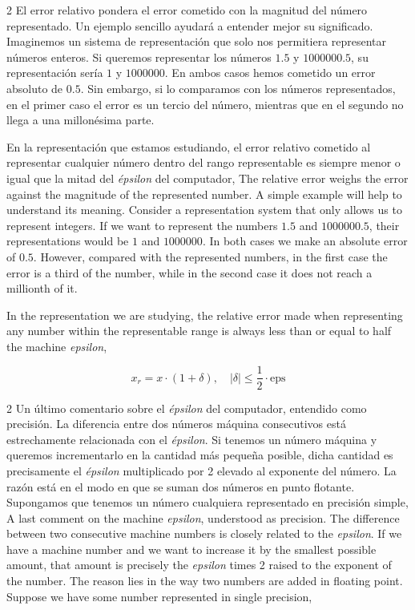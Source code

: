 \begin{paracol}{2}
El error relativo pondera el error cometido con la magnitud del número representado. Un ejemplo sencillo ayudará a entender mejor su significado. Imaginemos un sistema de representación que solo nos permitiera representar números enteros. Si queremos representar los números $1.5$ y $1000000.5$, su representación sería $1$ y $1000000$. En ambos casos hemos cometido un error absoluto de $0.5$. Sin embargo, si lo comparamos con los números representados, en el primer caso el error es un tercio del número, mientras que en el segundo no llega a una millonésima parte.

En la representación que estamos estudiando, el error relativo cometido al representar cualquier número dentro del rango representable es siempre menor o igual que la mitad del \emph{épsilon} del computador,
\switchcolumn
The relative error weighs the error against the magnitude of the represented number. A simple example will help to understand its meaning. Consider a representation system that only allows us to represent integers. If we want to represent the numbers $1.5$ and $1000000.5$, their representations would be $1$ and $1000000$. In both cases we make an absolute error of $0.5$. However, compared with the represented numbers, in the first case the error is a third of the number, while in the second case it does not reach a millionth of it.

In the representation we are studying, the relative error made when representing any number within the representable range is always less than or equal to half the machine \emph{epsilon},
\end{paracol}

\begin{equation*}
x_r=x\cdot (1+ \delta), \quad | \delta| \leq \frac{1}{2}\cdot \text{eps}
\end{equation*}

\begin{paracol}{2}
Un último comentario sobre el \emph{épsilon} del computador, entendido como precisión. La diferencia entre dos números máquina consecutivos está estrechamente relacionada con el \emph{épsilon}. Si tenemos un número máquina y queremos incrementarlo en la cantidad más pequeña posible, dicha cantidad es precisamente el \emph{épsilon} multiplicado por 2 elevado al exponente del número. La razón está en el modo en que se suman dos números en punto flotante. Supongamos que tenemos un número cualquiera representado en precisión simple,
\switchcolumn
A last comment on the machine \emph{epsilon}, understood as precision. The difference between two consecutive machine numbers is closely related to the \emph{epsilon}. If we have a machine number and we want to increase it by the smallest possible amount, that amount is precisely the \emph{epsilon} times 2 raised to the exponent of the number. The reason lies in the way two numbers are added in floating point. Suppose we have some number represented in single precision,
\end{paracol}

